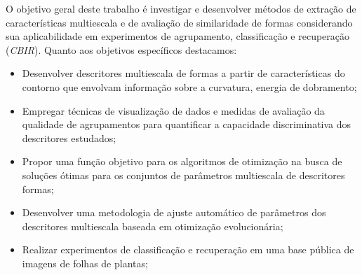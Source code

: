




O objetivo geral deste trabalho é investigar e desenvolver métodos de extração de características multiescala e de avaliação de similaridade de formas considerando sua aplicabilidade em experimentos de agrupamento, classificação e recuperação (\emph{CBIR}). Quanto aos objetivos específicos destacamos:

\begin{itemize}
\item Desenvolver descritores multiescala de formas a partir de características do contorno que envolvam informação sobre a curvatura, energia de dobramento;

\item Empregar técnicas de visualização de dados e medidas de avaliação da qualidade de agrupamentos para quantificar a capacidade discriminativa dos descritores estudados; 

\item Propor uma função objetivo para os algoritmos de otimização na busca de soluções ótimas para os conjuntos de parâmetros multiescala de descritores formas;

\item Desenvolver uma metodologia de ajuste automático de parâmetros dos descritores multiescala baseada em otimização evolucionária;

\item Realizar experimentos de classificação e recuperação em uma base pública de imagens de folhas de plantas;

\end{itemize}


